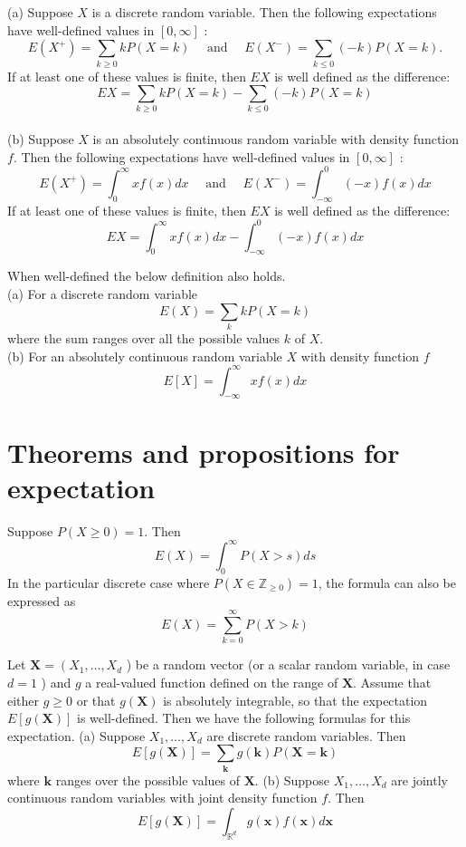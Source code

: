 \documentclass[11pt]{elegantbook}
\begin{document}
\begin{theorem}
(a)
Suppose $X$ is a discrete random variable. Then the following expectations have well-defined values in $[0, \infty]$ :
$$
E\left(X^{+}\right)=\sum_{k \geq 0} k P(X=k) \quad \text { and } \quad E\left(X^{-}\right)=\sum_{k \leq 0}(-k) P(X=k) .
$$
If at least one of these values is finite, then $E X$ is well defined as the difference:
$$
E X=\sum_{k \geq 0} k P(X=k)-\sum_{k \leq 0}(-k) P(X=k)
$$\\

(b) Suppose $X$ is an absolutely continuous random variable with density function $f$. Then the following expectations have well-defined values in $[0, \infty]$ :
$$
E\left(X^{+}\right)=\int_0^{\infty} x f(x) d x \quad \text { and } \quad E\left(X^{-}\right)=\int_{-\infty}^0(-x) f(x) d x
$$
If at least one of these values is finite, then $E X$ is well defined as the difference:
$$
E X=\int_0^{\infty} x f(x) d x-\int_{-\infty}^0(-x) f(x) d x
$$
\end{theorem}
\begin{corollary}
When well-defined the below definition also holds. \\
(a) For a discrete random variable
$$
E(X)=\sum_k k P(X=k)
$$
where the sum ranges over all the possible values $k$ of $X$.\\
(b) For an absolutely continuous random variable $X$ with density function $f$
$$
E[X]=\int_{-\infty}^{\infty} x f(x) d x
$$
\end{corollary}
\section{Theorems and propositions for expectation}
\begin{theorem}
Suppose $P(X \geq 0)=1$. Then
$$
E(X)=\int_0^{\infty} P(X>s) d s
$$
In the particular discrete case where $P\left(X \in \mathbb{Z}_{\geq 0}\right)=1$, the formula can also be expressed as
$$
E(X)=\sum_{k=0}^{\infty} P(X>k)
$$
\end{theorem}

\begin{theorem}
Let $\mathbf{X}=\left(X_1, \ldots, X_d\right.$ ) be a random vector (or a scalar random variable, in case $d=1$ ) and $g$ a real-valued function defined on the range of $\mathbf{X}$. Assume that either $g \geq 0$ or that $g(\mathbf{X})$ is absolutely integrable, so that the expectation $E[g(\mathbf{X})]$ is well-defined. Then we have the following formulas for this expectation.
(a) Suppose $X_1, \ldots, X_d$ are discrete random variables. Then
$$
E[g(\mathbf{X})]=\sum_{\mathbf{k}} g(\mathbf{k}) P(\mathbf{X}=\mathbf{k})
$$
where $\mathbf{k}$ ranges over the possible values of $\mathbf{X}$.
(b) Suppose $X_1, \ldots, X_d$ are jointly continuous random variables with joint density function $f$. Then
$$
E[g(\mathbf{X})]=\int_{\mathbb{R}^d} g(\mathbf{x}) f(\mathbf{x}) d \mathbf{x}
$$
\end{theorem}
\end{document}

